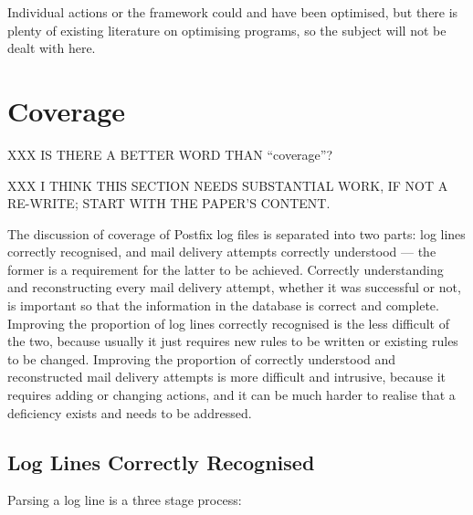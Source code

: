 Individual actions or the framework could and have been optimised, but
there is plenty of existing literature on optimising programs, so the
subject will not be dealt with here.



\FloatBarrier{}

\section{Coverage}

XXX IS THERE A BETTER WORD THAN ``coverage''?

XXX I THINK THIS SECTION NEEDS SUBSTANTIAL WORK, IF NOT A RE-WRITE\@; START
WITH THE PAPER'S CONTENT\@.

\label{parsing coverage}

The discussion of \parsernames{} coverage of Postfix log files is separated
into two parts: log lines correctly recognised, and mail delivery attempts
correctly understood --- the former is a requirement for the latter to be
achieved.  Correctly understanding and reconstructing every mail delivery
attempt, whether it was successful or not, is important so that the
information in the database is correct and complete.  Improving the
proportion of log lines correctly recognised is the less difficult of the
two, because usually it just requires new rules to be written or existing
rules to be changed.  Improving the proportion of correctly understood and
reconstructed mail delivery attempts is more difficult and intrusive,
because it requires adding or changing actions, and it can be much harder
to realise that a deficiency exists and needs to be addressed.

\subsection{Log Lines Correctly Recognised}

\label{log-lines-covered}

Parsing a log line is a three stage process:

